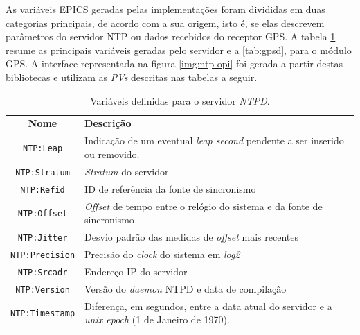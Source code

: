 As variáveis EPICS geradas pelas implementações foram divididas em duas
categorias principais, de acordo com a sua origem, isto é, se elas
descrevem parâmetros do servidor NTP ou dados recebidos do receptor GPS. A
tabela \ref{tab:ntpd} resume as principais variáveis geradas pelo servidor e a
\ref{tab:gpsd}, para o módulo GPS. A interface representada na figura
\ref{img:ntp-opi} foi gerada a partir destas bibliotecas e utilizam as
\textit{PVs} descritas nas tabelas a seguir.

\begin{table}[h]

	\centering
	\caption{\label{tab:ntpd} Variáveis definidas para o servidor
	\textit{NTPD}.}
	\begin{tabular}{| c | p{} |}
		\hline
		\textbf{Nome} & \textbf{Descrição} \\	\hhline{|=|=|}
		\texttt{NTP:Leap} & Indicação de um eventual \textit{leap second} pendente a
		ser inserido ou removido. \\
		\hline \texttt{NTP:Stratum} & \textit{Stratum} do servidor \\ \hline
		\texttt{NTP:Refid} & ID de referência da fonte de sincronismo \\ \hline
		\texttt{NTP:Offset} & \textit{Offset} de tempo entre o relógio do sistema e da
		fonte de sincronismo \\
		\hline \texttt{NTP:Jitter} & Desvio padrão das medidas de \textit{offset} mais
		recentes \\ \hline 
		\texttt{NTP:Precision} & Precisão do \textit{clock} do sistema em
		\textit{log2} \\
		\hline \texttt{NTP:Srcadr} & Endereço IP do servidor \\ \hline 			
		\texttt{NTP:Version} & Versão do \textit{daemon} NTPD e data de compilação \\
		\hline \texttt{NTP:Timestamp} & Diferença, em segundos, entre a data atual do
		servidor e a \textit{unix epoch} (1 de Janeiro de 1970). \\ \hline
	\end{tabular}	    
\end{table}

